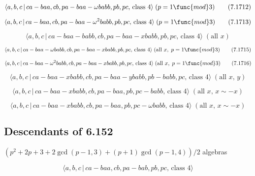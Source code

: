 \documentclass[10pt]{article}
\begin{document}
\begin{equation}
\langle a,b,c\,|\,ca-baa,cb,pa-baa-\omega babb,pb,pc,\,\text{class }4\rangle
\;(p=1\func{mod}3)  \tag{7.1712}
\end{equation}

\begin{equation}
\langle a,b,c\,|\,ca-baa,cb,pa-baa-\omega ^{2}babb,pb,pc,\,\text{class }%
4\rangle \;(p=1\func{mod}3)  \tag{7.1713}
\end{equation}

\begin{equation}
\langle a,b,c\,|\,ca-baa-babb,cb,pa-baa-xbabb,pb,pc,\,\text{class }4\rangle
\;(\text{all }x)  \tag{7.1714}
\end{equation}

\begin{equation}
\langle a,b,c\,|\,ca-baa-\omega babb,cb,pa-baa-xbabb,pb,pc,\,\text{class }%
4\rangle \;(\text{all }x,\;p=1\func{mod}3)  \tag{7.1715}
\end{equation}

\begin{equation}
\langle a,b,c\,|\,ca-baa-\omega ^{2}babb,cb,pa-baa-xbabb,pb,pc,\,\text{class 
}4\rangle \;(\text{all }x,\;p=1\func{mod}3)  \tag{7.1716}
\end{equation}

\begin{equation}
\langle a,b,c\,|\,ca-baa-xbabb,cb,pa-baa-ybabb,pb-babb,pc,\,\text{class }%
4\rangle \;(\text{all }x,\,y)  \tag{7.1717}
\end{equation}

\begin{equation}
\langle a,b,c\,|\,ca-baa-xbabb,cb,pa-baa,pb,pc-babb,\,\text{class }4\rangle
\;(\text{all }x,\,x\sim -x)  \tag{7.1718}
\end{equation}

\begin{equation}
\langle a,b,c\,|\,ca-baa-xbabb,cb,pa-baa,pb,pc-\omega babb,\,\text{class }%
4\rangle \;(\text{all }x,\,x\sim -x)  \tag{7.1719}
\end{equation}

\subsection{Descendants of 6.152}

$(p^{2}+2p+3+2\gcd (p-1,3)+(p+1)\gcd (p-1,4))/2$ algebras

\begin{equation}
\langle a,b,c\,|\,ca-baa,cb,pa-bab,pb,pc,\,\text{class }4\rangle 
\tag{7.1720}
\end{equation}
\end{document}
